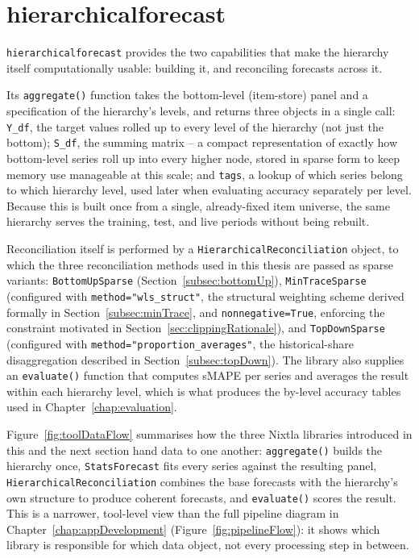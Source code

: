 \section{hierarchicalforecast}
\label{sec:hierarchicalforecastTool}

\texttt{hierarchicalforecast} \cite{Olivares:2023} provides the two capabilities that make the hierarchy itself computationally usable: building it, and reconciling forecasts across it.

Its \texttt{aggregate()} function takes the bottom-level (item-store) panel and a specification of the hierarchy's levels, and returns three objects in a single call: \texttt{Y\_df}, the target values rolled up to every level of the hierarchy (not just the bottom); \texttt{S\_df}, the summing matrix -- a compact representation of exactly how bottom-level series roll up into every higher node, stored in sparse form to keep memory use manageable at this scale; and \texttt{tags}, a lookup of which series belong to which hierarchy level, used later when evaluating accuracy separately per level. Because this is built once from a single, already-fixed item universe, the same hierarchy serves the training, test, and live periods without being rebuilt.

Reconciliation itself is performed by a \texttt{HierarchicalReconciliation} object, to which the three reconciliation methods used in this thesis are passed as sparse variants: \texttt{BottomUpSparse} (Section~\ref{subsec:bottomUp}), \texttt{MinTraceSparse} (configured with \texttt{method="wls\_struct"}, the structural weighting scheme derived formally in Section~\ref{subsec:minTrace}, and \texttt{nonnegative=True}, enforcing the constraint motivated in Section~\ref{sec:clippingRationale}), and \texttt{TopDownSparse} (configured with \texttt{method="proportion\_averages"}, the historical-share disaggregation described in Section~\ref{subsec:topDown}). The library also supplies an \texttt{evaluate()} function that computes sMAPE per series and averages the result within each hierarchy level, which is what produces the by-level accuracy tables used in Chapter~\ref{chap:evaluation}.

Figure~\ref{fig:toolDataFlow} summarises how the three Nixtla libraries introduced in this and the next section hand data to one another: \texttt{aggregate()} builds the hierarchy once, \texttt{StatsForecast} fits every series against the resulting panel, \texttt{HierarchicalReconciliation} combines the base forecasts with the hierarchy's own structure to produce coherent forecasts, and \texttt{evaluate()} scores the result. This is a narrower, tool-level view than the full pipeline diagram in Chapter~\ref{chap:appDevelopment} (Figure~\ref{fig:pipelineFlow}): it shows which library is responsible for which data object, not every processing step in between.

